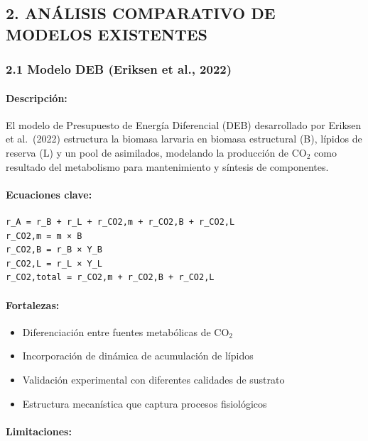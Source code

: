 \documentclass[
]{article}
\providecommand{\tightlist}{%
  \setlength{\itemsep}{0pt}\setlength{\parskip}{0pt}}
\begin{document}
\subsection{2. ANÁLISIS COMPARATIVO DE MODELOS
EXISTENTES}\label{anuxe1lisis-comparativo-de-modelos-existentes}

\subsubsection{2.1 Modelo DEB (Eriksen et al.,
2022)}\label{modelo-deb-eriksen-et-al.-2022}

\paragraph{Descripción:}\label{descripciuxf3n}

El modelo de Presupuesto de Energía Diferencial (DEB) desarrollado por
Eriksen et al.~(2022) estructura la biomasa larvaria en biomasa
estructural (B), lípidos de reserva (L) y un pool de asimilados,
modelando la producción de CO$_2$ como resultado del metabolismo para
mantenimiento y síntesis de componentes.

\paragraph{Ecuaciones clave:}\label{ecuaciones-clave}

\begin{verbatim}
r_A = r_B + r_L + r_CO2,m + r_CO2,B + r_CO2,L
r_CO2,m = m × B
r_CO2,B = r_B × Y_B
r_CO2,L = r_L × Y_L
r_CO2,total = r_CO2,m + r_CO2,B + r_CO2,L
\end{verbatim}

\paragraph{Fortalezas:}\label{fortalezas}

\begin{itemize}
\tightlist
\item
  Diferenciación entre fuentes metabólicas de CO$_2$
\item
  Incorporación de dinámica de acumulación de lípidos
\item
  Validación experimental con diferentes calidades de sustrato
\item
  Estructura mecanística que captura procesos fisiológicos
\end{itemize}

\paragraph{Limitaciones:}\label{limitaciones}
\end{document}
